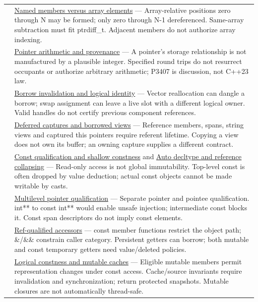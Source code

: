 {\begin{longtable}[]{@{}
  >{\raggedright\arraybackslash}p{}
  >{\raggedright\arraybackslash}p{}@{}}
119 & \hyperref[appendix-3f7e15effba6]{Named members versus array elements} --- Array-relative positions zero through N may be formed; only zero through N-1 dereferenced. Same-array subtraction must fit ptrdiff\_t. Adjacent members do not authorize array indexing. \\
120 & \hyperref[appendix-6af5921bc853]{Pointer arithmetic and provenance} --- A pointer's storage relationship is not manufactured by a plausible integer. Specified round trips do not resurrect occupants or authorize arbitrary arithmetic; P3407 is discussion, not C++23 law. \\
121 & \hyperref[appendix-f9b8b9188c7f]{Borrow invalidation and logical identity} --- Vector reallocation can dangle a borrow; swap assignment can leave a live slot with a different logical owner. Valid handles do not certify previous component references. \\
122 & \hyperref[appendix-aea529eb5175]{Deferred captures and borrowed views} --- Reference members, spans, string views and captured this pointers require referent lifetime. Copying a view does not own its buffer; an owning capture supplies a different contract. \\
123 & \hyperref[appendix-c25d60fed375]{Const qualification and shallow constness} and \hyperref[appendix-5d4252a42886]{Auto decltype and reference collapsing} --- Read-only access is not global immutability. Top-level const is often dropped by value deduction; actual const objects cannot be made writable by casts. \\
124 & \hyperref[appendix-5e1a7561cd98]{Multilevel pointer qualification} --- Separate pointer and pointee qualification. int** to const int** would enable unsafe injection; intermediate const blocks it. Const span descriptors do not imply const elements. \\
125 & \hyperref[appendix-d42039b1d6f7]{Ref-qualified accessors} --- const member functions restrict the object path; \&/\&\& constrain caller category. Persistent getters can borrow; both mutable and const temporary getters need value/deleted policies. \\
126 & \hyperref[appendix-f5593256bcaf]{Logical constness and mutable caches} --- Eligible mutable members permit representation changes under const access. Cache/source invariants require invalidation and synchronization; return protected snapshots. Mutable closures are not automatically thread-safe. \\
\end{longtable}
}

